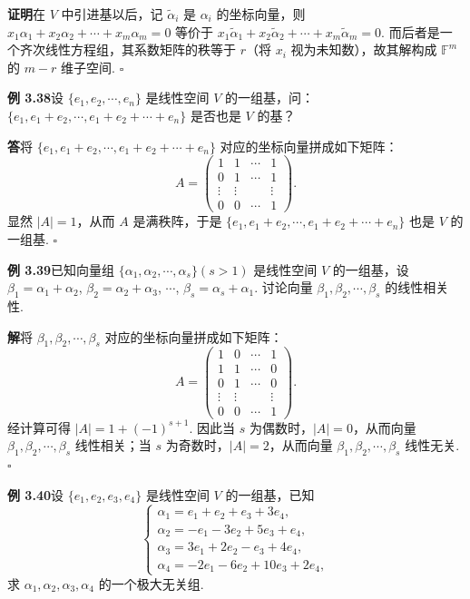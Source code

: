 \documentclass[UTF8,12pt,a4paper,fontset=fandol]{ctexart}
\begin{document}
\noindent\textbf{证明}\quad 在 $V$ 中引进基以后，记 $\widetilde\alpha_i$ 是 $\alpha_i$ 的坐标向量，则 $x_1\alpha_1+x_2\alpha_2+\cdots+x_m\alpha_m=0$ 等价于 $x_1\widetilde\alpha_1+x_2\widetilde\alpha_2+\cdots+x_m\widetilde\alpha_m=0$. 而后者是一个齐次线性方程组，其系数矩阵的秩等于 $r$（将 $x_i$ 视为未知数），故其解构成 $\mathbb{F}^m$ 的 $m-r$ 维子空间. $\square$

\noindent\textbf{例 3.38}\quad 设 $\{e_1,e_2,\cdots,e_n\}$ 是线性空间 $V$ 的一组基，问：$\{e_1,e_1+e_2,\cdots,e_1+e_2+\cdots+e_n\}$ 是否也是 $V$ 的基？

\noindent\textbf{答}\quad 将 $\{e_1,e_1+e_2,\cdots,e_1+e_2+\cdots+e_n\}$ 对应的坐标向量拼成如下矩阵：
\[
A=
\begin{pmatrix}
1 & 1 & \cdots & 1\\
0 & 1 & \cdots & 1\\
\vdots & \vdots &        & \vdots\\
0 & 0 & \cdots & 1
\end{pmatrix}.
\]
显然 $|A|=1$，从而 $A$ 是满秩阵，于是 $\{e_1,e_1+e_2,\cdots,e_1+e_2+\cdots+e_n\}$ 也是 $V$ 的一组基. $\square$

\noindent\textbf{例 3.39}\quad 已知向量组 $\{\alpha_1,\alpha_2,\cdots,\alpha_s\}(s>1)$ 是线性空间 $V$ 的一组基，设 $\beta_1=\alpha_1+\alpha_2$, $\beta_2=\alpha_2+\alpha_3$, $\cdots$, $\beta_s=\alpha_s+\alpha_1$. 讨论向量 $\beta_1,\beta_2,\cdots,\beta_s$ 的线性相关性.

\noindent\textbf{解}\quad 将 $\beta_1,\beta_2,\cdots,\beta_s$ 对应的坐标向量拼成如下矩阵：
\[
A=
\begin{pmatrix}
1 & 0 & \cdots & 1\\
1 & 1 & \cdots & 0\\
0 & 1 & \cdots & 0\\
\vdots & \vdots &        & \vdots\\
0 & 0 & \cdots & 1
\end{pmatrix}.
\]
经计算可得 $|A|=1+(-1)^{s+1}$. 因此当 $s$ 为偶数时，$|A|=0$，从而向量 $\beta_1,\beta_2,\cdots,\beta_s$ 线性相关；当 $s$ 为奇数时，$|A|=2$，从而向量 $\beta_1,\beta_2,\cdots,\beta_s$ 线性无关. $\square$

\noindent\textbf{例 3.40}\quad 设 $\{e_1,e_2,e_3,e_4\}$ 是线性空间 $V$ 的一组基，已知
\[
\left\{
\begin{array}{l}
\alpha_1=e_1+e_2+e_3+3e_4,\\
\alpha_2=-e_1-3e_2+5e_3+e_4,\\
\alpha_3=3e_1+2e_2-e_3+4e_4,\\
\alpha_4=-2e_1-6e_2+10e_3+2e_4,
\end{array}
\right.
\]
求 $\alpha_1,\alpha_2,\alpha_3,\alpha_4$ 的一个极大无关组.
\end{document}
